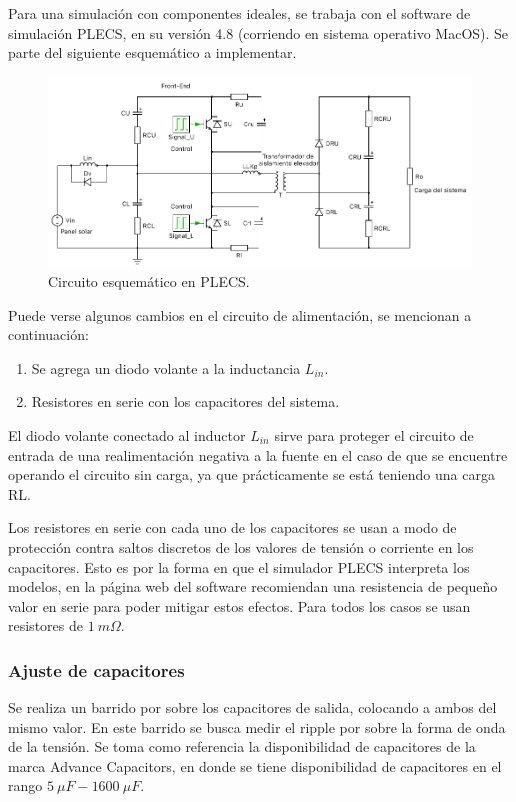 Para una simulación con componentes ideales, se trabaja con el software de simulación PLECS, en su versión 4.8 (corriendo en sistema operativo MacOS). Se parte del siguiente esquemático a implementar. 

\begin{figure}
	\centering
	\includegraphics[width=1\linewidth]{../schematic_mod}
	\caption{Circuito esquemático en PLECS.}
	\label{fig:schematic}
\end{figure}

Puede verse algunos cambios en el circuito de alimentación, se mencionan a continuación:

\begin{enumerate}
	\item Se agrega un diodo volante a la inductancia $L_{in}$.
	\item Resistores en serie con los capacitores del sistema.
\end{enumerate}

El diodo volante conectado al inductor $L_{in}$ sirve para proteger el circuito de entrada de una realimentación negativa a la fuente en el caso de que se encuentre operando el circuito sin carga, ya que prácticamente se está teniendo una carga RL.

Los resistores en serie con cada uno de los capacitores se usan a modo de protección contra saltos discretos de los valores de tensión o corriente en los capacitores. Esto es por la forma en que el simulador PLECS interpreta los modelos, en la página web del software recomiendan una resistencia de pequeño valor en serie para poder mitigar estos efectos. Para todos los casos se usan resistores de $1 \ m\Omega$.


\subsubsection{Ajuste de capacitores}

Se realiza un barrido por sobre los capacitores de salida, colocando a ambos del mismo valor. En este barrido se busca medir el ripple por sobre la forma de onda de la tensión. Se toma como referencia la disponibilidad de capacitores de la marca Advance Capacitors, en donde se tiene disponibilidad de capacitores en el rango $5 \ \mu F - 1600 \ \mu F$.

